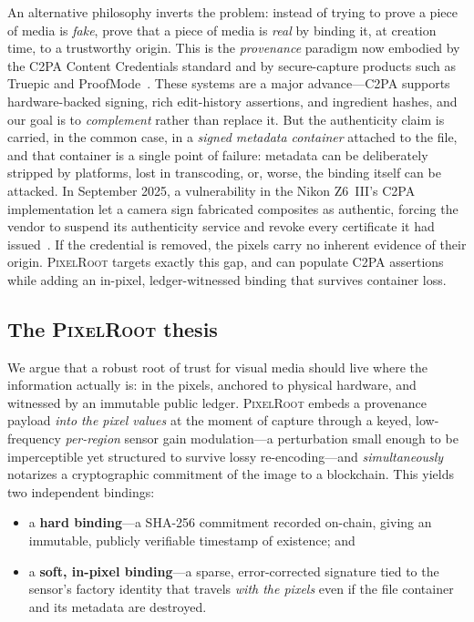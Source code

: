\documentclass[journal]{IEEEtran}
\newcommand{\pr}{\textup{\textsc{PixelRoot}}}
\begin{document}
An alternative philosophy inverts the problem: instead of trying to prove a
piece of media is \emph{fake}, prove that a piece of media is \emph{real} by
binding it, at creation time, to a trustworthy origin. This is the
\emph{provenance} paradigm now embodied by the C2PA Content Credentials
standard and by secure-capture products such as Truepic and
ProofMode~\cite{c2pa2024spec,truepic2024capture,proofmode2023,google2025c2pa}.
These systems are a major advance---C2PA supports hardware-backed signing, rich
edit-history assertions, and ingredient hashes, and our goal is to
\emph{complement} rather than replace it. But the authenticity claim is carried,
in the common case, in a \emph{signed metadata container} attached to the file,
and that container is a single point of failure: metadata can be deliberately
stripped by platforms, lost in transcoding, or, worse, the binding itself can be
attacked. In September 2025, a vulnerability in the Nikon Z6~III's C2PA
implementation let a camera sign fabricated composites as authentic, forcing the
vendor to suspend its authenticity service and revoke every certificate it had
issued~\cite{c2pa2026security}. If the credential is removed, the pixels carry no
inherent evidence of their origin. \pr{} targets exactly this gap, and can
populate C2PA assertions while adding an in-pixel, ledger-witnessed binding that
survives container loss.

\subsection{The \pr{} thesis}
We argue that a robust root of trust for visual media should live where the
information actually is: in the pixels, anchored to physical hardware, and
witnessed by an immutable public ledger. \pr{} embeds a provenance payload
\emph{into the pixel values} at the moment of capture through a keyed,
low-frequency \emph{per-region} sensor gain modulation---a perturbation small
enough to be imperceptible yet structured to survive lossy
re-encoding---and \emph{simultaneously} notarizes a cryptographic commitment of
the image to a blockchain. This yields two independent bindings:

\begin{itemize}
\item a \textbf{hard binding}---a \mbox{SHA-256} commitment recorded on-chain,
giving an immutable, publicly verifiable timestamp of existence; and
\item a \textbf{soft, in-pixel binding}---a sparse, error-corrected signature
tied to the sensor's factory identity that travels \emph{with the pixels} even
if the file container and its metadata are destroyed.
\end{itemize}
\end{document}
